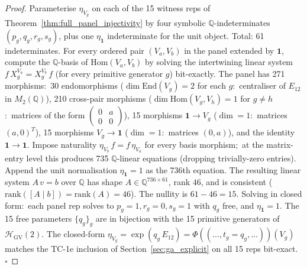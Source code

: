 \documentclass[11pt,a4paper]{article}
\theoremstyle{plain}
\theoremstyle{definition}
\newcommand{\HGV}{\mathcal{H}_{\mathrm{GV}}}
\newcommand{\End}{\mathrm{End}}
\newcommand{\Hom}{\mathrm{Hom}}
\newcommand{\Q}{\mathbb{Q}}
\newcommand{\Phimap}{\Phi}
\begin{document}
\begin{proof}
Parameterise $\eta_{V_{g}}$ on each of the 15 witness reps of
Theorem~\ref{thm:full_panel_injectivity} by four symbolic
$\Q$-indeterminates $(p_{g}, q_{g}, r_{g}, s_{g})$, plus one
$\eta_{\mathbf{1}}$ indeterminate for the unit object. Total: 61
indeterminates. For every ordered pair $(V_{a}, V_{b})$ in the panel
extended by $\mathbf{1}$, compute the $\Q$-basis of
$\Hom(V_{a}, V_{b})$ by solving the intertwining linear system
$f\, X_{g}^{V_{a}} = X_{g}^{V_{b}}\, f$ (for every primitive
generator $g$) bit-exactly. The panel has 271 morphisms:\
30 endomorphisms ($\dim \End(V_{g}) = 2$ for each $g$:\
centraliser of $E_{12}$ in $M_{2}(\Q)$), 210 cross-pair morphisms
($\dim \Hom(V_{g}, V_{h}) = 1$ for $g \ne h$:\ matrices of the form
$\begin{pmatrix} 0 & a \\ 0 & 0 \end{pmatrix}$), 15 morphisms
$\mathbf{1} \to V_{g}$ ($\dim = 1$:\ matrices $(a, 0)^{T}$), 15
morphisms $V_{g} \to \mathbf{1}$ ($\dim = 1$:\ matrices $(0, a)$),
and the identity $\mathbf{1} \to \mathbf{1}$. Impose naturality
$\eta_{V_{b}}\, f = f\, \eta_{V_{a}}$ for every basis morphism;\ at
the matrix-entry level this produces 735 $\Q$-linear equations
(dropping trivially-zero entries). Append the unit normalisation
$\eta_{\mathbf{1}} = 1$ as the 736th equation. The resulting linear
system $A\, v = b$ over $\Q$ has shape $A \in \Q^{736 \times 61}$,
rank $46$, and is consistent
($\mathrm{rank}([A \mid b]) = \mathrm{rank}(A) = 46$). The nullity
is $61 - 46 = 15$. Solving in closed form:\ each panel rep solves
to $p_{g} = 1, r_{g} = 0, s_{g} = 1$ with $q_{g}$ free, and
$\eta_{\mathbf{1}} = 1$. The 15 free parameters $\{q_{g}\}_{g}$ are
in bijection with the 15 primitive generators of $\HGV(2)$. The
closed-form $\eta_{V_{g}} = \exp(q_{g}\, E_{12}) =
\Phimap((\ldots, t_{g} = q_{g}, \ldots))(V_{g})$ matches the TC-1e
inclusion of Section~\ref{sec:ga_explicit} on all 15 reps bit-exact.
$\square$
\end{proof}
\end{document}
